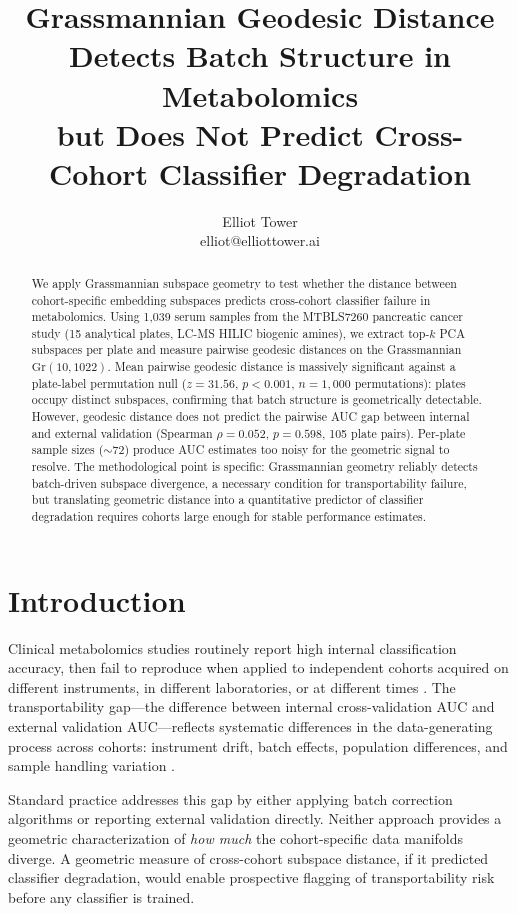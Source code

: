 \documentclass{article}
\title{Grassmannian Geodesic Distance Detects Batch Structure in Metabolomics\\but Does Not Predict Cross-Cohort Classifier Degradation}
\author{\name Elliot Tower \\
      \email elliot@elliottower.ai}
\begin{document}
\maketitle

\begin{abstract}
We apply Grassmannian subspace geometry to test whether the distance between cohort-specific embedding subspaces predicts cross-cohort classifier failure in metabolomics. Using 1{,}039 serum samples from the MTBLS7260 pancreatic cancer study (15 analytical plates, LC-MS HILIC biogenic amines), we extract top-$k$ PCA subspaces per plate and measure pairwise geodesic distances on the Grassmannian $\mathrm{Gr}(10, 1022)$. Mean pairwise geodesic distance is massively significant against a plate-label permutation null ($z = 31.56$, $p < 0.001$, $n = 1{,}000$ permutations): plates occupy distinct subspaces, confirming that batch structure is geometrically detectable. However, geodesic distance does not predict the pairwise AUC gap between internal and external validation (Spearman $\rho = 0.052$, $p = 0.598$, 105 plate pairs). Per-plate sample sizes ($\sim$72) produce AUC estimates too noisy for the geometric signal to resolve. The methodological point is specific: Grassmannian geometry reliably detects batch-driven subspace divergence, a necessary condition for transportability failure, but translating geometric distance into a quantitative predictor of classifier degradation requires cohorts large enough for stable performance estimates.
\end{abstract}

\section{Introduction}

Clinical metabolomics studies routinely report high internal classification accuracy, then fail to reproduce when applied to independent cohorts acquired on different instruments, in different laboratories, or at different times \citep{broadhurst2006statistical}. The transportability gap---the difference between internal cross-validation AUC and external validation AUC---reflects systematic differences in the data-generating process across cohorts: instrument drift, batch effects, population differences, and sample handling variation \citep{wehrens2016improved}.

Standard practice addresses this gap by either applying batch correction algorithms \citep{johnson2007adjusting} or reporting external validation directly. Neither approach provides a geometric characterization of \emph{how much} the cohort-specific data manifolds diverge. A geometric measure of cross-cohort subspace distance, if it predicted classifier degradation, would enable prospective flagging of transportability risk before any classifier is trained.
\end{document}
